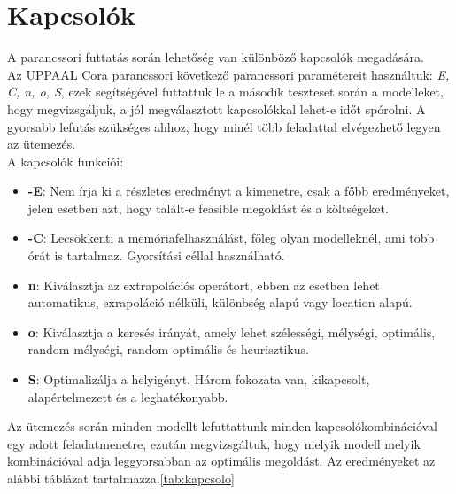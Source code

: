 \documentclass {report}
\begin{document}
   \section{Kapcsolók}
   A parancssori futtatás során lehetőség van különböző kapcsolók megadására.\\ 
   Az UPPAAL Cora parancssori következő parancssori paramétereit használtuk: \emph{E, C, n, o, S}, ezek segítségével futtattuk le a második teszteset során a modelleket, hogy megvizsgáljuk, a jól megválasztott kapcsolókkal lehet-e időt spórolni. A gyorsabb lefutás szükséges ahhoz, hogy minél több feladattal elvégezhető legyen az ütemezés.\\
   A kapcsolók funkciói:\\
   \begin{itemize}
   \item \textbf{-E}: Nem írja ki a részletes eredményt a kimenetre, csak a főbb eredményeket, jelen esetben azt, hogy talált-e feasible megoldást és a költségeket.
   \item \textbf{-C}: Lecsökkenti a memóriafelhasználást, főleg olyan modelleknél, ami több órát is tartalmaz. Gyorsítási céllal használható.
   \item \textbf{n}: Kiválasztja az extrapolációs operátort, ebben az esetben lehet automatikus, exrapoláció nélküli, különbség alapú vagy location alapú.
   \item \textbf{o}: Kiválasztja a keresés irányát, amely lehet szélességi, mélységi, optimális, random mélységi, random optimális és heurisztikus.
   \item \textbf{S}: Optimalizálja a helyigényt. Három fokozata van, kikapcsolt, alapértelmezett és a leghatékonyabb.
   \end{itemize}
   Az ütemezés során minden modellt lefuttattunk minden kapcsolókombinációval egy adott feladatmenetre, ezután megvizsgáltuk, hogy melyik modell melyik kombinációval adja leggyorsabban az optimális megoldást. Az eredményeket az alábbi táblázat tartalmazza.\ref{tab:kapcsolo}\\
\end{document}
